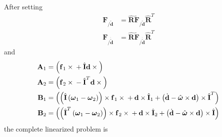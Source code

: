 \documentclass[10pt,dvips,fleqn,subeqn]{report}
\newcommand{\T}[1]{\bm{\mathbf{#1}}}
\newcommand{\TT}[1]{\bm{\mathbf{#1}}}
\begin{document}
After setting
\begin{subequations}
\begin{align}
	\T{F}_{/\tilde{\T{d}}} &=
		\hat{\T{R}} \tilde{\T{F}}_{/\tilde{\T{d}}} \hat{\T{R}}^T \\
	\T{F}_{/\dot{\tilde{\T{d}}}} &=
		\hat{\T{R}} \tilde{\T{F}}_{/\dot{\tilde{\T{d}}}} \hat{\T{R}}^T
\end{align}
\end{subequations}
and
\begin{subequations}
\label{sec:deformable-displacement-joint-invariant-linearization-helpers}
\begin{align}
	\TT{A}_1 &= \plbr{\T{f}_1\times{} + \hat{\TT{I}}\T{d}\times{}} \\
	\TT{A}_2 &= \plbr{\T{f}_2\times{} - \hat{\TT{I}}^T\T{d}\times{}} \\
	\TT{B}_1 &= \plbr{
			\plbr{\hat{\T{I}}\plbr{\T{\omega}_1 - \T{\omega}_2}}\times\T{f}_1\times{}
			+ \T{d}\times\hat{\T{I}}_1
			+ \plbr{\dot{\T{d}} - \hat{\T{\omega}}\times\T{d}}\times\hat{\T{I}}^T
		} \\
	\TT{B}_2 &= \plbr{
			\plbr{\hat{\T{I}}^T\plbr{\T{\omega}_1 - \T{\omega}_2}}\times\T{f}_2\times{}
			+ \T{d}\times\hat{\T{I}}_2
			+ \plbr{\dot{\T{d}} - \hat{\T{\omega}}\times\T{d}}\times\hat{\T{I}}
		}
\end{align}
\end{subequations}
the complete linearized problem is
\end{document}

